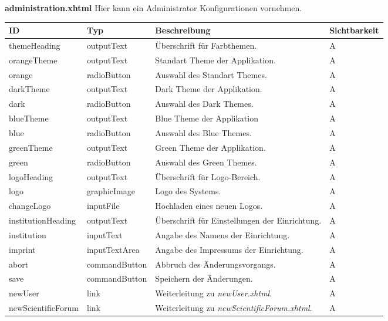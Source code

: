 \textbf{administration.xhtml} Hier kann ein Administrator Konfigurationen vornehmen.

\begin{tabular}[H]{|m{2cm}|m{3cm}|m{6cm}|m{2.5cm}|}
    \hline
    \textbf{ID} & \textbf{Typ} & \textbf{Beschreibung} & \textbf{Sichtbarkeit} \\
    \hline
    \hline
    themeHeading & outputText & Überschrift für Farbthemen. & A\\
    \hline
    orangeTheme & outputText & Standart Theme der Applikation. & A\\
    \hline
    orange & radioButton & Auswahl des Standart Themes. & A\\
    \hline
    darkTheme & outputText & Dark Theme der Applikation. & A\\
    \hline
    dark & radioButton & Auswahl des Dark Themes. & A\\
    \hline
    blueTheme & outputText & Blue Theme der Applikation & A\\
    \hline
    blue & radioButton & Auswahl des Blue Themes. & A\\
    \hline
    greenTheme & outputText & Green Theme der Applikation. & A\\
    \hline
    green & radioButton & Auswahl des Green Themes. & A\\
    \hline
    logoHeading & outputText & Überschrift für Logo-Bereich. & A\\
    \hline
    logo & graphicImage & Logo des Systems. & A\\
    \hline
    changeLogo & inputFile & Hochladen eines neuen Logos. & A\\
    \hline
    institutionHeading & outputText & Überschrift für Einstellungen der Einrichtung. & A\\
    \hline
    institution & inputText & Angabe des Namens der Einrichtung. & A\\
    \hline
    imprint & inputTextArea & Angabe des Impressums der Einrichtung. & A\\
    \hline
    abort & commandButton & Abbruch des Änderungsvorgangs. & A \\
    \hline
    save & commandButton & Speichern der Änderungen. & A\\
    \hline
    newUser & link & Weiterleitung zu \emph{newUser.xhtml}. & A\\
    \hline
    newScientificForum & link & Weiterleitung zu \emph{newScientificForum.xhtml}. & A\\
    \hline
\end{tabular}

